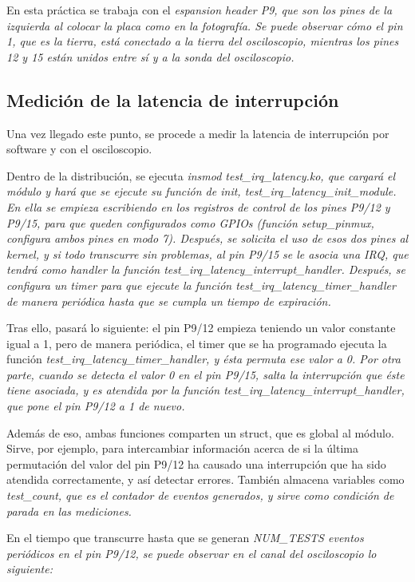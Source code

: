 \documentclass[../main.tex]{subfiles}
\begin{document}
En esta práctica se trabaja con el \it{espansion header P9}, que son los pines de la izquierda al colocar la placa como en la fotografía. Se puede observar cómo el pin 1, que es la tierra, está conectado a la tierra del osciloscopio, mientras los pines 12 y 15 están unidos entre sí y a la sonda del osciloscopio.

\subsection{Medición de la latencia de interrupción}

Una vez llegado este punto, se procede a medir la latencia de interrupción por software y con el osciloscopio.

Dentro de la distribución, se ejecuta \it{insmod test\_irq\_latency.ko}, que cargará el módulo y hará que se ejecute su función de init, \it{test\_irq\_latency\_init\_module}. En ella se empieza escribiendo en los registros de control de los pines P9/12 y P9/15, para que queden configurados como GPIOs (función \it{setup\_pinmux}, configura ambos pines en modo 7). Después, se solicita el uso de esos dos pines al kernel, y si todo transcurre sin problemas, al pin P9/15 se le asocia una IRQ, que tendrá como handler la función \it{test\_irq\_latency\_interrupt\_handler}. Después, se configura un timer para que ejecute la función \it{test\_irq\_latency\_timer\_handler} de manera periódica hasta que se cumpla un tiempo de expiración.

Tras ello, pasará lo siguiente: el pin P9/12 empieza teniendo un valor constante igual a 1, pero de manera periódica, el timer que se ha programado ejecuta la función \it{test\_irq\_latency\_timer\_handler}, y ésta permuta ese valor a 0. Por otra parte, cuando se detecta el valor 0 en el pin P9/15, salta la interrupción que éste tiene asociada, y es atendida por la función \it{test\_irq\_latency\_interrupt\_handler}, que pone el pin P9/12 a 1 de nuevo.

Además de eso, ambas funciones comparten un struct, que es global al módulo. Sirve, por ejemplo, para intercambiar información acerca de si la última permutación del valor del pin P9/12 ha causado una interrupción que ha sido atendida correctamente, y así detectar errores. También almacena variables como  \it{test\_count}, que es el contador de eventos generados, y sirve como condición de parada en las mediciones.

En el tiempo que transcurre hasta que se generan \it{NUM\_TESTS} eventos periódicos en el pin P9/12, se puede observar en el canal del osciloscopio lo siguiente:
\end{document}
